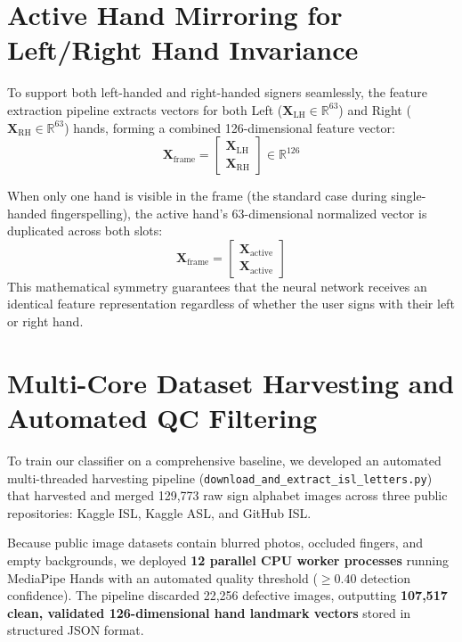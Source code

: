 \section{Active Hand Mirroring for Left/Right Hand Invariance}
To support both left-handed and right-handed signers seamlessly, the feature extraction pipeline extracts vectors for both Left ($\mathbf{X}_{\text{LH}} \in \mathbb{R}^{63}$) and Right ($\mathbf{X}_{\text{RH}} \in \mathbb{R}^{63}$) hands, forming a combined 126-dimensional feature vector:
\begin{equation}
\mathbf{X}_{\text{frame}} = \begin{bmatrix} \mathbf{X}_{\text{LH}} \\ \mathbf{X}_{\text{RH}} \end{bmatrix} \in \mathbb{R}^{126}
\end{equation}

When only one hand is visible in the frame (the standard case during single-handed fingerspelling), the active hand's 63-dimensional normalized vector is duplicated across both slots:
\begin{equation}
\mathbf{X}_{\text{frame}} = \begin{bmatrix} \mathbf{X}_{\text{active}} \\ \mathbf{X}_{\text{active}} \end{bmatrix}
\end{equation}
This mathematical symmetry guarantees that the neural network receives an identical feature representation regardless of whether the user signs with their left or right hand.

\section{Multi-Core Dataset Harvesting and Automated QC Filtering}
To train our classifier on a comprehensive baseline, we developed an automated multi-threaded harvesting pipeline (\texttt{download\_and\_extract\_isl\_letters.py}) that harvested and merged 129,773 raw sign alphabet images across three public repositories: Kaggle ISL, Kaggle ASL, and GitHub ISL.

Because public image datasets contain blurred photos, occluded fingers, and empty backgrounds, we deployed \textbf{12 parallel CPU worker processes} running MediaPipe Hands with an automated quality threshold ($\ge 0.40$ detection confidence). The pipeline discarded 22,256 defective images, outputting \textbf{107,517 clean, validated 126-dimensional hand landmark vectors} stored in structured JSON format.
